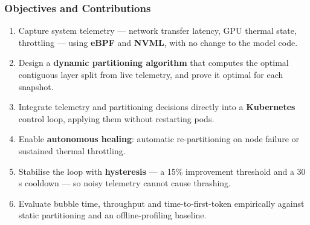 \documentclass[aspectratio=169,11pt]{beamer}
\begin{document}
\begin{frame}
  \frametitle{Objectives and Contributions}
  \begin{enumerate}\itemsep0.55em
    \item Capture system telemetry --- network transfer latency, GPU thermal
      state, throttling --- using \textbf{eBPF} and \textbf{NVML}, with no
      change to the model code.
    \item Design a \textbf{dynamic partitioning algorithm} that computes the
      optimal contiguous layer split from live telemetry, and prove it optimal
      for each snapshot.
    \item Integrate telemetry and partitioning decisions directly into a
      \textbf{Kubernetes} control loop, applying them without restarting pods.
    \item Enable \textbf{autonomous healing}: automatic re-partitioning on node
      failure or sustained thermal throttling.
    \item Stabilise the loop with \textbf{hysteresis} --- a 15\% improvement
      threshold and a 30\,s cooldown --- so noisy telemetry cannot cause
      thrashing.
    \item Evaluate bubble time, throughput and time-to-first-token empirically
      against static partitioning and an offline-profiling baseline.
  \end{enumerate}
\end{frame}
\end{document}
